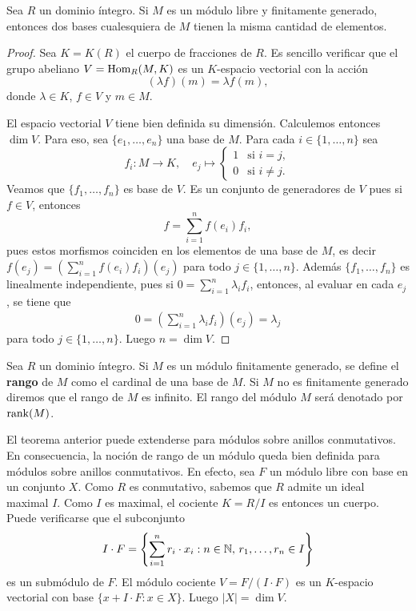 \begin{theorem}
Sea $R$ un dominio íntegro. 
Si $M$ es un módulo libre y finitamente generado, entonces dos bases cualesquiera de $M$ 
tienen la misma cantidad de elementos.
\end{theorem}

\begin{proof}
Sea $K=K(R)$ el cuerpo de fracciones de $R$. Es sencillo verificar que el grupo abeliano  
$V=\operatorname{Hom}_R(M,K)$ es un $K$-espacio vectorial con la acción 
\[
(\lambda f)(m)=\lambda f(m),
\]
donde $\lambda\in K$, $f\in V$ y $m\in M$.

El espacio vectorial $V$ tiene bien definida su dimensión. 
Calculemos entonces $\dim V$. Para eso, sea $\{e_1,\dots,e_n\}$ una base de $M$. 
Para cada $i\in\{1,\dots,n\}$ sea
\[
f_i\colon M\to K,\quad
e_j\mapsto\begin{cases}
1 & \text{si $i=j$},\\
0 & \text{si $i\ne j$}.
\end{cases}
\]
Veamos que $\{f_1,\dots,f_n\}$ es base de $V$. Es un conjunto de generadores de $V$ pues 
si $f\in V$, entonces
\[
f=\sum_{i=1}^n f(e_i)f_i,
\]
pues estos morfismos coinciden en los elementos de una base de $M$, es decir 
$f(e_j)=(\sum_{i=1}^n f(e_i)f_i)(e_j)$ para todo $j\in\{1,\dots,n\}$.    
Además $\{f_1,\dots,f_n\}$ es linealmente independiente, pues si $0=\sum_{i=1}^n\lambda_if_i$, 
entonces, al evaluar en cada $e_j$, se tiene que 
\begin{align*}
0=\left(\sum_{i=1}^n \lambda_if_i\right)(e_j)=\lambda_j
\end{align*}
para todo $j\in\{1,\dots,n\}$. Luego $n=\dim V$. 
\end{proof}

\begin{definition}
Sea $R$ un dominio íntegro. Si $M$ es un módulo finitamente generado, se 
define el \textbf{rango} de $M$ como el cardinal de una base de $M$. Si $M$ no es finitamente
generado diremos que el rango de $M$ es infinito. El rango del módulo $M$ será denotado por $\operatorname{rank}(M)$.   
\end{definition}


El teorema anterior puede extenderse para módulos sobre anillos conmutativos. En consecuencia,
la noción de rango de un módulo queda bien definida para módulos sobre anillos conmutativos.
En efecto, sea $F$ un módulo libre con base en un conjunto $X$. 
Como $R$ es conmutativo, sabemos que $R$ admite un ideal 
maximal $I$. Como $I$ es maximal, el cociente $K=R/I$ es entonces un cuerpo. Puede verificarse
que el subconjunto
\[
I\cdot F=\left\{\sum_{i=1}^n r_i\cdot x_i:n\in\mathbb{N},\,r_1,\dots,r_n\in I\right\}
\]
es un submódulo de $F$. El módulo cociente $V=F/(I\cdot F)$ es un $K$-espacio
vectorial con base $\{x+I\cdot F:x\in X\}$. Luego $|X|=\dim V$. 
